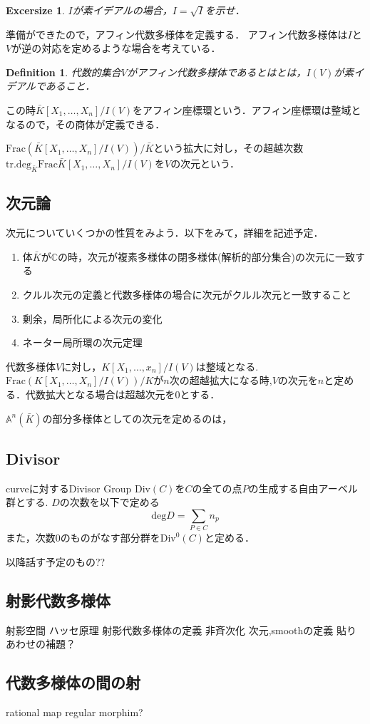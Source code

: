 \documentclass{ujarticle}
\newtheorem{dfn}[thm]{Definition}
\newtheorem{exs}[thm]{Excersize}
\begin{document}
\begin{exs}
  $I$が素イデアルの場合，$I = \sqrt{I}$を示せ．
\end{exs}
準備ができたので，アフィン代数多様体を定義する．
アフィン代数多様体は$I$と$V$が逆の対応を定めるような場合を考えている．

\begin{dfn}
 代数的集合$V$がアフィン代数多様体であるとはとは，$I(V)$が素イデアルであること．
 \end{dfn}
 この時$ \bar{K}[X_1,\dots,X_n]/I(V)$をアフィン座標環という．アフィン座標環は整域となるので，その商体が定義できる．

$\mathrm{Frac}({\bar{K}[X_1,\dots,X_n]/I(V)})/\bar{K}$という拡大に対し，その超越次数$\mathrm{tr.deg}_{\bar{K}}\mathrm{Frac}{\bar{K}[X_1,\dots,X_n]/I(V)}$を$V$の次元という．



\subsection{次元論}
\label{subs:次元論}

次元についていくつかの性質をみよう．以下をみて，詳細を記述予定．
\begin{enumerate}
  \setlength{\parskip}{0cm} %
  \setlength{\itemsep}{0cm} %
  \item 体$\bar{K}$が$\mathbb{C}$の時，次元が複素多様体の閉多様体(解析的部分集合)の次元に一致する
  \item クルル次元の定義と代数多様体の場合に次元がクルル次元と一致すること
  \item 剰余，局所化による次元の変化
  \item ネーター局所環の次元定理
\end{enumerate}

代数多様体$V$に対し，$K[X_1,\dots,x_n]/I(V)$は整域となる.$\mathrm{Frac}(K[X_1,\dots,X_n]/I(V))/K$が$n$次の超越拡大になる時,$V$の次元を$n$と定める．代数拡大となる場合は超越次元を$0$とする．

$\mathbb{A}^n(\bar{K})$の部分多様体としての次元を定めるのは，


\subsection{Divisor}
\label{sub:Divisor}
curveに対するDivisor Group $\mathrm{Div}(C)$を$C$の全ての点$P$の生成する自由アーベル群とする.
$D$の次数を以下で定める
\begin{equation*}
 \mathrm{deg}D = \sum_{P \in C}n_p
\end{equation*}
また，次数$0$のものがなす部分群を$\mathrm{Div}^0(C)$と定める．

以降話す予定のもの??

\subsection{射影代数多様体}
\label{subs:射影代数多様体}
射影空間
ハッセ原理
射影代数多様体の定義
非斉次化
次元,smoothの定義
貼りあわせの補題？

\subsection{代数多様体の間の射}
\label{subs:代数多様体の間の射}
rational map
regular
morphim?
\end{document}
